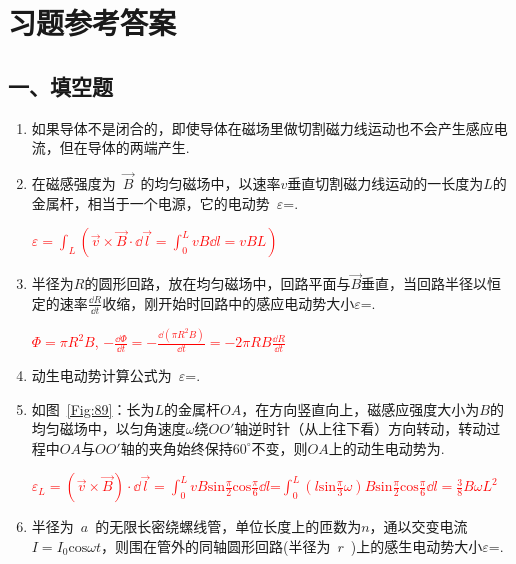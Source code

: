 \section{习题参考答案}
\subsection*{一、填空题}
\begin{enumerate}
    \item 如果导体不是闭合的，即使导体在磁场里做切割磁力线运动也不会产生感应电流，但在导体的两端产生.
    \item 在磁感强度为~$\vec{B}$~的均匀磁场中，以速率$v$垂直切割磁力线运动的一长度为$L$的金属杆，相当于一个电源，它的电动势~$\varepsilon$=.
    \begin{note}
        \textcolor{red}{$\varepsilon=\int_L (\vec{v}\times\vec{B}\cdot \dd \vec{l}=\int_{0}^{L}vB\dd l = vBL)$}
    \end{note}
    \item 半径为$R$的圆形回路，放在均匀磁场中，回路平面与$\vec{B}$垂直，当回路半径以恒定的速率$\frac{\dd R}{\dd t}$收缩，刚开始时回路中的感应电动势大小$\varepsilon$=.
    \begin{note}
       \textcolor{red}{$\varPhi=\pi R^2 B$, $-\frac{\dd \varPhi }{\dd t}=-\frac{\dd (\pi R^2 B)}{\dd t}=-2\pi RB\frac{\dd R}{\dd t}$}
    \end{note}
    \item 动生电动势计算公式为~$\varepsilon$=.
    \item 如图~\ref{Fig:89}：长为$L$的金属杆$OA$，在方向竖直向上，磁感应强度大小为$B$的均匀磁场中，以匀角速度$\omega$绕$OO'$轴逆时针（从上往下看）方向转动，转动过程中$OA$与$OO'$轴的夹角始终保持$60^\circ$不变，则$OA$上的动生电动势为.
    \begin{note}
        \textcolor{red}{$\varepsilon_L=(\vec{v}\times\vec{B})\cdot\dd \vec{l}=\int_0^L vB\mathrm{sin}\frac{\pi}{2}\mathrm{cos}\frac{\pi}{6}\dd l$=$\int_0^L(l\mathrm{sin}\frac{\pi}{3}\omega)B\mathrm{sin}\frac{\pi}{2}\mathrm{cos}\frac{\pi}{6}\dd l=\frac{3}{8}B\omega L^2$}
    \end{note}
    \item 半径为~$a$~的无限长密绕螺线管，单位长度上的匝数为$n$，通以交变电流$I=I_0\mathrm{cos}\omega t$，则围在管外的同轴圆形回路(半径为~$r$~)上的感生电动势大小$\varepsilon$=.

\end{enumerate}
